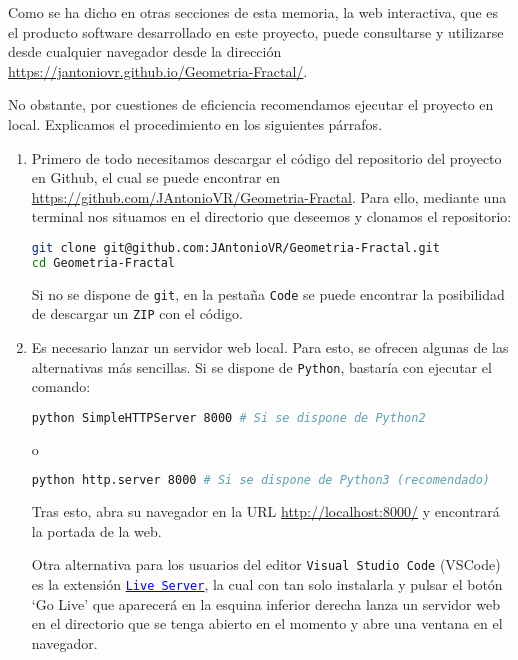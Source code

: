 Como se ha dicho en otras secciones de esta memoria, la web interactiva, que es el producto software desarrollado en este proyecto, puede consultarse y utilizarse desde cualquier navegador desde la dirección \url{https://jantoniovr.github.io/Geometria-Fractal/}.

No obstante, por cuestiones de eficiencia recomendamos ejecutar el
proyecto en local. Explicamos el procedimiento en los siguientes
párrafos.

\begin{enumerate}
\def\labelenumi{\arabic{enumi}.}
\item
  Primero de todo necesitamos descargar el código del repositorio del proyecto en Github, el cual se puede encontrar en \url{https://github.com/JAntonioVR/Geometria-Fractal}. Para ello, mediante una terminal nos situamos en el directorio que deseemos y clonamos el repositorio:

  \begin{lstlisting}[language=bash]
git clone git@github.com:JAntonioVR/Geometria-Fractal.git
cd Geometria-Fractal
  \end{lstlisting}

  Si no se dispone de \texttt{git}, en la pestaña \texttt{Code} se puede encontrar la posibilidad de descargar un \texttt{ZIP} con el código.

\item
  Es necesario lanzar un servidor web local. Para esto, se ofrecen algunas de las alternativas más sencillas. Si se dispone de
  \texttt{Python}, bastaría con ejecutar el comando:

  \begin{lstlisting}[language=bash]
python SimpleHTTPServer 8000 # Si se dispone de Python2
  \end{lstlisting}

  o

  \begin{lstlisting}[language=bash]
python http.server 8000 # Si se dispone de Python3 (recomendado)
  \end{lstlisting}
  
  Tras esto, abra su navegador en la URL \url{http://localhost:8000/} y encontrará la portada de la web.

  Otra alternativa para los usuarios del editor \texttt{Visual\ Studio\ Code} (VSCode) es la extensión \href{https://marketplace.visualstudio.com/items?itemName=ritwickdey.LiveServer}{\textcolor{blue}{\texttt{Live\ Server}}}, la cual con tan solo instalarla y pulsar el botón `Go Live' que aparecerá en la esquina inferior derecha lanza un servidor web en el directorio que se tenga abierto en el momento y abre una ventana en el navegador.


\end{enumerate}
